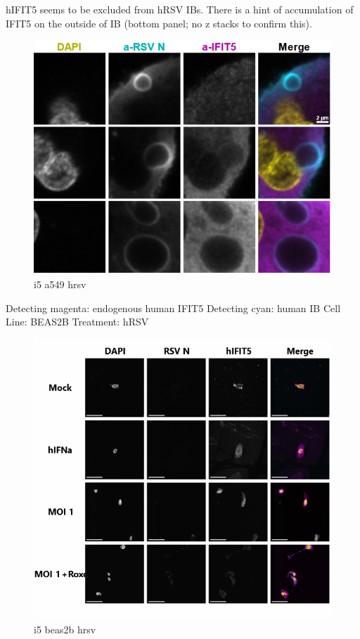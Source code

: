 hIFIT5 seems to be excluded from hRSV IBs. There is a hint of accumulation of IFIT5 on the outside of IB (bottom panel; no z stacks to confirm this). 

\begin{figure}
    \centering
    \includegraphics[width=1\linewidth]{09. Chapter 4/Figs/05. IFIT5/02. a549 hrsv.png}
    \caption[i5 a549 hrsv]{i5 a549 hrsv}
    \label{fig:i5 a549 hrsv}
\end{figure}

Detecting magenta: endogenous human IFIT5 \newline
Detecting cyan: human IB \newline
Cell Line: BEAS2B \newline
Treatment: hRSV \newline

\begin{figure}
    \centering
    \includegraphics[width=1\linewidth]{09. Chapter 4/Figs/05. IFIT5/03. beas2b hrsv.png}
    \caption[i5 beas2b hrsv]{i5 beas2b hrsv}
    \label{fig:i5 beas2b hrsv}
\end{figure}

